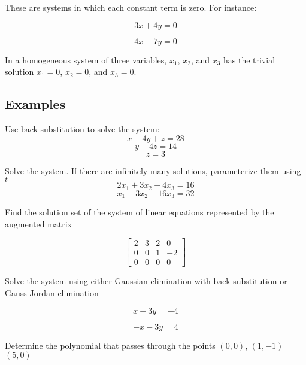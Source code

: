 \documentclass{report}
\begin{document}
\begin{tcolorbox}[title = Definition of Homogeneous System of Equations]
	These are systems in which each constant term is zero. For instance:

$$
3x+4y=0
$$

$$
4x-7y=0
$$

\noindent In a homogeneous system of three variables, $x_1$, $x_2$, and $x_3$ has the trivial solution $x_1 = 0$, $x_2 = 0$, and $x_3 = 0$.

\end{tcolorbox}

\subsection{Examples}

\begin{tcolorbox}[colframe = lightred]
	Use back substitution to solve the system:
	$$
	x-4y+z=28
	$$
	$$
	y+4z= 14
	$$
	$$
	z = 3
	$$
\end{tcolorbox}

\begin{tcolorbox}[colframe = lightred]
Solve the system. If there are infinitely many solutions, parameterize them using $t$
$$
2x_1 + 3x_2 - 4x_3 = 16
$$
$$
x_1 - 3x_2 + 16x_3 = 32
$$

\end{tcolorbox}

\begin{tcolorbox}[colframe = lightred]
	Find the solution set of the system of linear equations represented by the augmented matrix
	
	$$
	\begin{bmatrix}
		2 & 3 & 2 & 0 \\
		0 & 0 & 1 & -2 \\
		0 & 0 & 0 & 0
	\end{bmatrix}
	$$
\end{tcolorbox}

\begin{tcolorbox}[colframe = lightred]
	Solve the system using either Gaussian elimination with back-substitution or Gauss-Jordan elimination
	
	$$
	x+3y=-4
	$$
	
	$$
	-x-3y=4
	$$
\end{tcolorbox}

\begin{tcolorbox}[colframe = lightred]
		Determine the polynomial that passes through the points $(0,0)$, $(1,-1)$ $(5,0)$
\end{tcolorbox}
\end{document}
